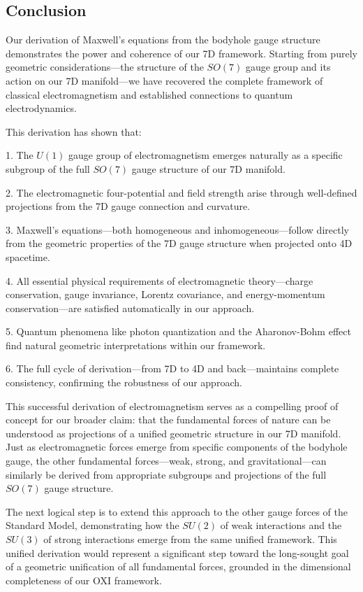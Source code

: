 \documentclass{article}
\begin{document}
\subsection{Conclusion}

Our derivation of Maxwell's equations from the bodyhole gauge structure demonstrates the power and coherence of our 7D framework. Starting from purely geometric considerations—the structure of the $SO(7)$ gauge group and its action on our 7D manifold—we have recovered the complete framework of classical electromagnetism and established connections to quantum electrodynamics.

This derivation has shown that:

1. The $U(1)$ gauge group of electromagnetism emerges naturally as a specific subgroup of the full $SO(7)$ gauge structure of our 7D manifold.

2. The electromagnetic four-potential and field strength arise through well-defined projections from the 7D gauge connection and curvature.

3. Maxwell's equations—both homogeneous and inhomogeneous—follow directly from the geometric properties of the 7D gauge structure when projected onto 4D spacetime.

4. All essential physical requirements of electromagnetic theory—charge conservation, gauge invariance, Lorentz covariance, and energy-momentum conservation—are satisfied automatically in our approach.

5. Quantum phenomena like photon quantization and the Aharonov-Bohm effect find natural geometric interpretations within our framework.

6. The full cycle of derivation—from 7D to 4D and back—maintains complete consistency, confirming the robustness of our approach.

This successful derivation of electromagnetism serves as a compelling proof of concept for our broader claim: that the fundamental forces of nature can be understood as projections of a unified geometric structure in our 7D manifold. Just as electromagnetic forces emerge from specific components of the bodyhole gauge, the other fundamental forces—weak, strong, and gravitational—can similarly be derived from appropriate subgroups and projections of the full $SO(7)$ gauge structure.

The next logical step is to extend this approach to the other gauge forces of the Standard Model, demonstrating how the $SU(2)$ of weak interactions and the $SU(3)$ of strong interactions emerge from the same unified framework. This unified derivation would represent a significant step toward the long-sought goal of a geometric unification of all fundamental forces, grounded in the dimensional completeness of our OXI framework.
\end{document}
